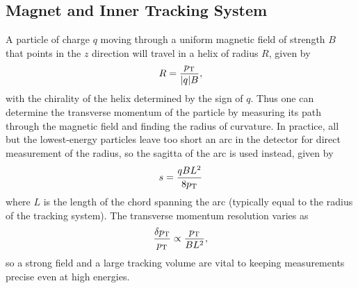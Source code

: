 \subsection{Magnet and Inner Tracking System}
A particle of charge $q$ moving through a uniform magnetic field of strength $B$ that points in the $z$ direction will travel in a helix of radius $R$, given by
\begin{equation}
  R = \frac{p_\mathrm{T}}{\lvert q\rvert B},
\end{equation}
with the chirality of the helix determined by the sign of $q$.
Thus one can determine the transverse momentum of the particle by measuring its path through the magnetic field and finding the radius of curvature.
In practice, all but the lowest-energy particles leave too short an arc in the detector for direct measurement of the radius, so the sagitta of the arc is used instead, given by
\begin{equation}
  s = \frac{qBL^2}{8p_\mathrm{T}}
\end{equation}
where $L$ is the length of the chord spanning the arc (typically equal to the radius of the tracking system).
The transverse momentum resolution varies as
\begin{equation}
  \frac{\delta p_\mathrm{T}}{p_\mathrm{T}} \propto \frac{p_\mathrm{T}}{BL^2},
\end{equation}
so a strong field and a large tracking volume are vital to keeping measurements precise even at high energies.

